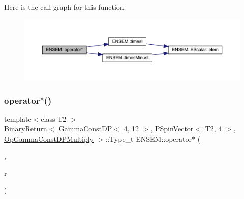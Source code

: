 Here is the call graph for this function\+:\nopagebreak
\begin{figure}[H]
\begin{center}
\leavevmode
\includegraphics[width=350pt]{dd/d6d/group__primspinvector_gad1bc0eb5b6f881a32c6fda1e7b14d083_cgraph}
\end{center}
\end{figure}
\mbox{\label{group__primspinvector_gab182b2b8559b1382be36d58f251cec0e}} 
\subsubsection{\texorpdfstring{operator$\ast$()}{operator*()}\hspace{0.1cm}{\footnotesize\ttfamily [29/32]}}
{\footnotesize\ttfamily template$<$class T2 $>$ \\
\mbox{\hyperlink{structENSEM_1_1BinaryReturn}{Binary\+Return}}$<$ \mbox{\hyperlink{classENSEM_1_1GammaConstDP}{Gamma\+Const\+DP}}$<$ 4, 12 $>$, \mbox{\hyperlink{classENSEM_1_1PSpinVector}{P\+Spin\+Vector}}$<$ T2, 4 $>$, \mbox{\hyperlink{structENSEM_1_1OpGammaConstDPMultiply}{Op\+Gamma\+Const\+D\+P\+Multiply}} $>$\+::Type\+\_\+t E\+N\+S\+E\+M\+::operator$\ast$ (\begin{DoxyParamCaption}\item[{const \mbox{\hyperlink{classENSEM_1_1GammaConstDP}{Gamma\+Const\+DP}}$<$ 4, 12 $>$ \&}]{,  }\item[{const \mbox{\hyperlink{classENSEM_1_1PSpinVector}{P\+Spin\+Vector}}$<$ T2, 4 $>$ \&}]{r }\end{DoxyParamCaption})\hspace{0.3cm}{\ttfamily [inline]}}

